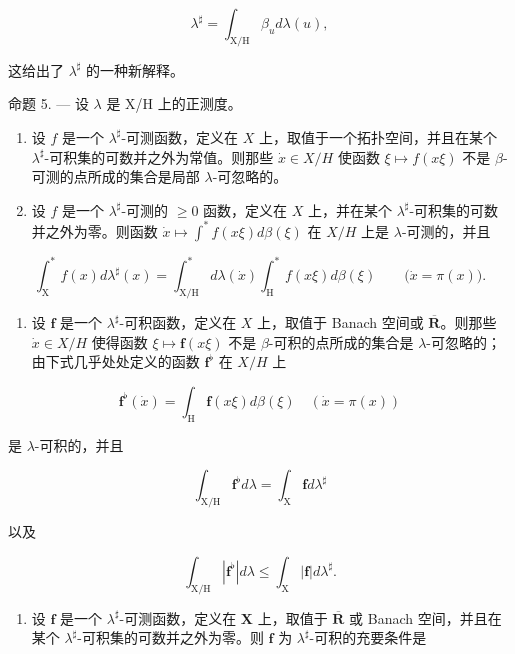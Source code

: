 \[
\lambda^ {\sharp} = \int_ {\mathrm{X/H}} \beta_ {u} d \lambda (u),\tag{10}
\]

这给出了 \(\lambda^{\sharp}\) 的一种新解释。

命题 5. --- 设 \(\lambda\) 是 X/H 上的正测度。

\begin{enumerate}
\def\labelenumi{\alph{enumi})}
\item
  设 \(f\) 是一个 \(\lambda^{\sharp}\)-可测函数，定义在 \(X\) 上，取值于一个拓扑空间，并且在某个 \(\lambda^{\sharp}\)-可积集的可数并之外为常值。则那些 \(\dot{x} \in X / H\) 使函数 \(\xi \mapsto f(x\xi)\) 不是 \(\beta\)-可测的点所成的集合是局部 \(\lambda\)-可忽略的。
\item
  设 \(f\) 是一个 \(\lambda^{\sharp}\)-可测的 \(\geqslant 0\) 函数，定义在 \(X\) 上，并在某个 \(\lambda^{\sharp}\)-可积集的可数并之外为零。则函数 \(\dot{x} \mapsto \int^{*} f(x\xi) d\beta(\xi)\) 在 \(X / H\) 上是 \(\lambda\)-可测的，并且
\end{enumerate}

\[
\int_ {\mathrm{X}} ^ {*} f (x) d \lambda^ {\sharp} (x) = \int_ {\mathrm{X/H}} ^ {*} d \lambda (\dot {x}) \int_ {\mathrm{H}} ^ {*} f (x \xi) d \beta (\xi) \qquad \big (\dot {x} = \pi (x) \big).
\]

\begin{enumerate}
\def\labelenumi{\alph{enumi})}
\setcounter{enumi}{2}
\tightlist
\item
  设 \(\mathbf{f}\) 是一个 \(\lambda^{\sharp}\)-可积函数，定义在 \(X\) 上，取值于 Banach 空间或 \(\overline{\mathbf{R}}\)。则那些 \(\dot{x} \in X / H\) 使得函数 \(\xi \mapsto \mathbf{f}(x\xi)\) 不是 \(\beta\)-可积的点所成的集合是 \(\lambda\)-可忽略的；由下式几乎处处定义的函数 \(\mathbf{f}^{\flat}\) 在 \(X / H\) 上
\end{enumerate}

\[
\mathbf {f} ^ {\flat} (\dot {x}) = \int_ {\mathrm{H}} \mathbf {f} (x \xi) d \beta (\xi) \quad \left(\dot {x} = \pi (x)\right)\tag{11}
\]

是 \(\lambda\)-可积的，并且

\[
\int_ {\mathrm{X/H}} \mathbf {f} ^ {\flat} d \lambda = \int_ {\mathrm{X}} \mathbf {f} d \lambda^ {\sharp}\tag{12}
\]

以及

\[
\int_ {\mathrm{X} / \mathrm{H}} | \mathbf {f} ^ {\flat} | d \lambda \leqslant \int_ {\mathrm{X}} | \mathbf {f} | d \lambda^ {\sharp}.\tag{13}
\]

\begin{enumerate}
\def\labelenumi{\alph{enumi})}
\setcounter{enumi}{3}
\tightlist
\item
  设 \(\mathbf{f}\) 是一个 \(\lambda^{\sharp}\)-可测函数，定义在 \(\mathbf{X}\) 上，取值于 \(\overline{\mathbf{R}}\) 或 Banach 空间，并且在某个 \(\lambda^{\sharp}\)-可积集的可数并之外为零。则 \(\mathbf{f}\) 为 \(\lambda^{\sharp}\)-可积的充要条件是
\end{enumerate}


